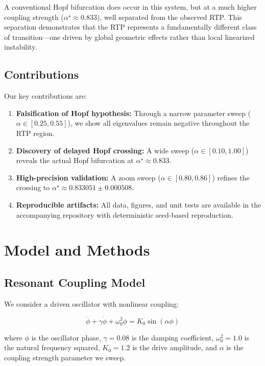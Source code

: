 \documentclass[11pt,twocolumn]{article}
\begin{document}
A conventional Hopf bifurcation does occur in this system, but at a much higher coupling strength
($\alpha^\star \approx 0.833$), well separated from the observed RTP. This separation demonstrates that the RTP
represents a fundamentally different class of transition—one driven by global geometric effects rather than
local linearized instability.

\subsection{Contributions}

Our key contributions are:

\begin{enumerate}
  \item \textbf{Falsification of Hopf hypothesis:} Through a narrow parameter sweep ($\alpha \in [0.25, 0.55]$),
        we show all eigenvalues remain negative throughout the RTP region.
  \item \textbf{Discovery of delayed Hopf crossing:} A wide sweep ($\alpha \in [0.10, 1.00]$) reveals the actual
        Hopf bifurcation at $\alpha^\star \approx 0.833$.
  \item \textbf{High-precision validation:} A zoom sweep ($\alpha \in [0.80, 0.86]$) refines the crossing to
        $\alpha^\star \approx 0.833051 \pm 0.000508$.
  \item \textbf{Reproducible artifacts:} All data, figures, and unit tests are available in the accompanying
        repository with deterministic seed-based reproduction.
\end{enumerate}

\section{Model and Methods}

\subsection{Resonant Coupling Model}

We consider a driven oscillator with nonlinear coupling:

\begin{equation}
  \ddot{\phi} + \gamma \dot{\phi} + \omega_0^2 \phi = K_0 \sin(\alpha \phi)
\end{equation}

where $\phi$ is the oscillator phase, $\gamma = 0.08$ is the damping coefficient, $\omega_0^2 = 1.0$ is the
natural frequency squared, $K_0 = 1.2$ is the drive amplitude, and $\alpha$ is the coupling strength parameter
we sweep.
\end{document}
